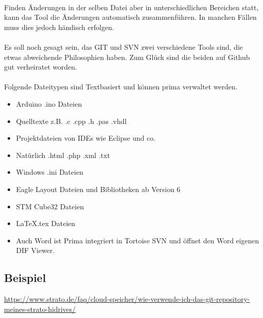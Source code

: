 \ \\
Finden Änderungen in der selben Datei aber in unterschiedlichen Bereichen statt, kann das Tool die Änderungen automatisch zusammenführen. In manchen Fällen muss dies jedoch händisch erfolgen.\\
\ \\
Es soll noch gesagt sein, das GIT und SVN zwei verschiedene Tools sind, die etwas abweichende Philosophien haben. Zum Glück sind die beiden auf Github gut verheiratet worden.\\
\ \\
Folgende Dateitypen sind Textbasiert und können prima verwaltet werden.
\begin{itemize}
\item Arduino .ino Dateien
\item Quelltexte z.B. .c .cpp .h .pas .vhdl
\item Projektdateien von IDEs wie Eclipse und co.
\item Natürlich .html .php .xml .txt
\item Windows .ini Dateien
\item Eagle Layout Dateien und Bibliotheken ab Version 6
\item STM Cube32 Dateien
\item \LaTeX .tex Dateien
\item Auch Word ist Prima integriert in Tortoise SVN und öffnet den Word eigenen DIF Viewer.
\end{itemize}

\subsection{Beispiel}
\url{https://www.strato.de/faq/cloud-speicher/wie-verwende-ich-das-git-repository-meines-strato-hidrives/}


